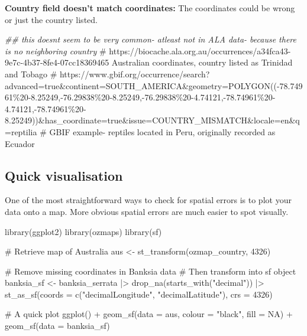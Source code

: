 \documentclass[
  letterpaper,
  DIV=11,
  numbers=noendperiod,
  oneside]{scrreprt}
\newenvironment{Shaded}{\begin{snugshade}}{\end{snugshade}}
\newcommand{\AttributeTok}[1]{\textcolor[rgb]{0.40,0.45,0.13}{#1}}
\newcommand{\CommentTok}[1]{\textcolor[rgb]{0.37,0.37,0.37}{#1}}
\newcommand{\ConstantTok}[1]{\textcolor[rgb]{0.56,0.35,0.01}{#1}}
\newcommand{\DecValTok}[1]{\textcolor[rgb]{0.68,0.00,0.00}{#1}}
\newcommand{\DocumentationTok}[1]{\textcolor[rgb]{0.37,0.37,0.37}{\textit{#1}}}
\newcommand{\FunctionTok}[1]{\textcolor[rgb]{0.28,0.35,0.67}{#1}}
\newcommand{\NormalTok}[1]{\textcolor[rgb]{0.00,0.23,0.31}{#1}}
\newcommand{\OtherTok}[1]{\textcolor[rgb]{0.00,0.23,0.31}{#1}}
\newcommand{\SpecialCharTok}[1]{\textcolor[rgb]{0.37,0.37,0.37}{#1}}
\newcommand{\StringTok}[1]{\textcolor[rgb]{0.13,0.47,0.30}{#1}}
\begin{document}
\textbf{Country field doesn't match coordinates:} The coordinates could
be wrong or just the country listed.

\begin{Shaded}
\begin{Highlighting}[]
\DocumentationTok{\#\# this doesnt seem to be very common{-} atleast not in ALA data{-} because there is no neighboring country}
\CommentTok{\# https://biocache.ala.org.au/occurrences/a34fca43{-}9e7c{-}4b37{-}8fe4{-}07cc18369465 Australian coordinates, country listed as Trinidad and Tobago}
\CommentTok{\# https://www.gbif.org/occurrence/search?advanced=true\&continent=SOUTH\_AMERICA\&geometry=POLYGON(({-}78.74961\%20{-}8.25249,{-}76.29838\%20{-}8.25249,{-}76.29838\%20{-}4.74121,{-}78.74961\%20{-}4.74121,{-}78.74961\%20{-}8.25249))\&has\_coordinate=true\&issue=COUNTRY\_MISMATCH\&locale=en\&q=reptilia   \# GBIF example{-} reptiles located in Peru, originally recorded as Ecuador}
\end{Highlighting}
\end{Shaded}

\hypertarget{quick-visualisation}{%
\subsection{Quick visualisation}\label{quick-visualisation}}

One of the most straightforward ways to check for spatial errors is to
plot your data onto a map. More obvious spatial errors are much easier
to spot visually.

\begin{Shaded}
\begin{Highlighting}[]
\FunctionTok{library}\NormalTok{(ggplot2)}
\FunctionTok{library}\NormalTok{(ozmaps) }
\FunctionTok{library}\NormalTok{(sf)}

\CommentTok{\# Retrieve map of Australia}
\NormalTok{aus }\OtherTok{\textless{}{-}} \FunctionTok{st\_transform}\NormalTok{(ozmap\_country, }\DecValTok{4326}\NormalTok{)}

\CommentTok{\# Remove missing coordinates in Banksia data}
\CommentTok{\# Then transform into \textquotesingle{}sf\textquotesingle{} object}
\NormalTok{banksia\_sf }\OtherTok{\textless{}{-}}\NormalTok{ banksia\_serrata }\SpecialCharTok{|\textgreater{}} 
  \FunctionTok{drop\_na}\NormalTok{(}\FunctionTok{starts\_with}\NormalTok{(}\StringTok{"decimal"}\NormalTok{)) }\SpecialCharTok{|\textgreater{}} 
  \FunctionTok{st\_as\_sf}\NormalTok{(}\AttributeTok{coords =} \FunctionTok{c}\NormalTok{(}\StringTok{"decimalLongitude"}\NormalTok{, }\StringTok{"decimalLatitude"}\NormalTok{), }
           \AttributeTok{crs =} \DecValTok{4326}\NormalTok{)}

\CommentTok{\# A quick plot}
\FunctionTok{ggplot}\NormalTok{() }\SpecialCharTok{+} 
  \FunctionTok{geom\_sf}\NormalTok{(}\AttributeTok{data =}\NormalTok{ aus, }\AttributeTok{colour =} \StringTok{"black"}\NormalTok{, }\AttributeTok{fill =} \ConstantTok{NA}\NormalTok{) }\SpecialCharTok{+} 
  \FunctionTok{geom\_sf}\NormalTok{(}\AttributeTok{data =}\NormalTok{ banksia\_sf)}
\end{Highlighting}
\end{Shaded}
\end{document}
